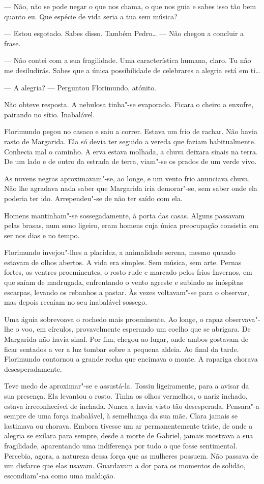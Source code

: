 --- Não, não se pode negar o que nos chama, o que nos guia e sabes isso
tão bem quanto eu. Que espécie de vida seria a tua sem música?

--- Estou esgotado. Sabes disso. Também Pedro\ldots{} --- Não chegou a concluir a
frase.

--- Não contei com a sua fragilidade. Uma característica humana, claro. Tu
não me desiludirás. Sabes que a única possibilidade de celebrares a
alegria está em ti\ldots{}

--- A alegria? --- Perguntou Florimundo, atónito.

Não obteve resposta. A nebulosa tinha"-se evaporado. Ficara o cheiro a
enxofre, pairando no sítio. Inabalável.

Florimundo pegou no casaco e saiu a correr. Estava um frio de rachar.
Não havia rasto de Margarida. Ela só devia ter seguido a vereda que
faziam habitualmente. Conhecia mal o caminho. A erva estava molhada, a
chuva deixara sinais na terra. De um lado e de outro da estrada de
terra, viam"-se os prados de um verde vivo.

As nuvens negras aproximavam"-se, ao longe, e um vento frio anunciava
chuva. Não lhe agradava nada saber que Margarida iria demorar"-se, sem
saber onde ela poderia ter ido. Arrependeu"-se de não ter saído com ela.

Homens mantinham"-se sossegadamente, à porta das casas. Alguns passavam
pelas brasas, num sono ligeiro, eram homens cuja única preocupação
consistia em ser nos dias e no tempo.

Florimundo invejou"-lhes a placidez, a animalidade serena, mesmo quando
estavam de olhos abertos. A vida era simples. Sem música, sem arte.
Pernas fortes, os ventres proeminentes, o rosto rude e marcado pelos
frios Invernos, em que saíam de madrugada, enfrentando o vento agreste e
subindo as inóspitas escarpas, levando os rebanhos a pastar. Às vezes
voltavam"-se para o observar, mas depois recaíam no seu inabalável
sossego.

Uma águia sobrevoava o rochedo mais proeminente. Ao longe, o rapaz
observava"-lhe o voo, em círculos, provavelmente esperando um coelho que
se abrigara. De Margarida não havia sinal. Por fim, chegou ao lugar,
onde ambos gostavam de ficar sentados a ver a luz tombar sobre a pequena
aldeia. Ao final da tarde. Florimundo contornou a grande rocha que
encimava o monte. A rapariga chorava desesperadamente.

Teve medo de aproximar"-se e assustá-la. Tossiu ligeiramente, para a
avisar da sua presença. Ela levantou o rosto. Tinha os olhos vermelhos,
o nariz inchado, estava irreconhecível de inchada. Nunca a havia visto
tão desesperada. Pensara"-a sempre de uma força inabalável, à semelhança
da sua mãe. Clara jamais se lastimava ou chorava. Embora tivesse um ar
permanentemente triste, de onde a alegria se exilara para sempre, desde
a morte de Gabriel, jamais mostrava a sua fragilidade, aparentando uma
indiferença por tudo o que fosse sentimental. Percebia, agora, a
natureza dessa força que as mulheres possuem. Não passava de um disfarce
que elas usavam. Guardavam a dor para os momentos de solidão,
escondiam"-na como uma maldição.

